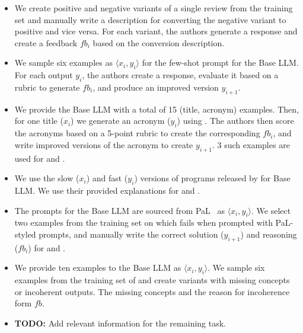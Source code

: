 \begin{itemize}
    \item \textbf{\sentxfer} We create positive and negative variants of a single review from the training set and manually write a description for converting the negative variant to positive and vice versa. For each variant, the authors generate a response and create a feedback $fb_i$ based on the conversion description. 
\item 
\textbf{\dialgen} 
We sample six examples as $\langle x_i, y_i \rangle$ for the few-shot prompt for the Base LLM. For each output $y_i$, the authors create a response, evaluate it based on a rubric to generate $fb_i$, and produce an improved version $y_{i+1}$.

\item \textbf{\acrogen} We provide the Base LLM with a total of 15 (title, acronym) examples. 
Then, for one title ($x_i$) we generate an acronym ($y_i$) using \chatgpt.
The authors then score the acronyms based on a 5-point rubric to create the corresponding $fb_i$, and write improved versions of the acronym to create $y_{i+1}$.
3 such examples are used for \itermod and \fbmod.

\item \textbf{\codeopt} We use the slow ($x_i$) and fast ($y_i$) versions of programs released by \citet{pie} for Base LLM.
We use their provided explanations \citep{pie} for \fbmod and \itermod.

\item \textbf{\gsm} The prompts for the Base LLM are sourced from PaL~\citep{gao2022pal} as $\langle x_i, y_i \rangle$. 
We select two examples from the training set on which \codex fails when prompted with PaL-styled prompts, and manually write the correct solution ($y_{i+1}$) and reasoning ($fb_i$) for \itermod and \fbmod.

\item \textbf{\commongenhard} We provide ten examples to the Base LLM as $\langle x_i, y_i \rangle$.
We sample six examples from the training set of \commongen and create variants with missing concepts or incoherent outputs. The missing concepts and the reason for incoherence form $fb$.


\item \textbf{TODO:} Add relevant information for the remaining task.

\end{itemize}








